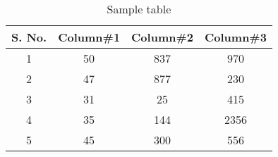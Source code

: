 \begin{table}[ht]
	\caption{Sample table} %
	\centering %
	\begin{tabular}{c c c c}
		\hline\hline %
		S. No. & Column\#1 & Column\#2 & Column\#3 \\ [0.5ex]
		\hline %
		1 & 50 & 837 & 970 \\
		2 & 47 & 877 & 230 \\
		3 & 31 & 25 & 415 \\
		4 & 35 & 144 & 2356 \\
		5 & 45 & 300 & 556 \\ [1ex] %
		\hline %
	\end{tabular}
	\label{table:nonlin} %
\end{table}
